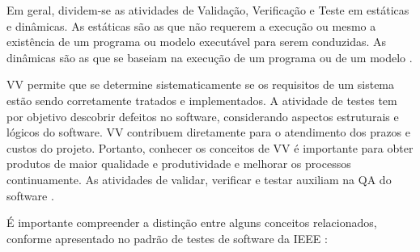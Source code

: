 Em geral, dividem-se as atividades de Validação, Verificação e Teste em estáticas e dinâmicas. As estáticas são as que não requerem a execução ou mesmo a existência de um programa ou modelo executável para serem conduzidas. As dinâmicas são as que se baseiam na execução de um programa ou de um modelo \cite{DELAMARO2007}.

\ac{VV} permite que se determine sistematicamente se os requisitos de um sistema estão sendo corretamente tratados e implementados. A atividade de testes tem por objetivo descobrir defeitos no software, considerando aspectos estruturais e lógicos do software. \ac{VV} contribuem diretamente para o atendimento dos prazos e custos do projeto. Portanto, conhecer os conceitos de \ac{VV} é importante para obter produtos de maior qualidade e produtividade e melhorar os processos continuamente. As atividades de validar, verificar e testar auxiliam na \ac{QA} do software \cite{HIRAMA2011}.


É importante compreender a distinção entre alguns conceitos relacionados, conforme apresentado no padrão de testes de software da IEEE \cite{159342}:

